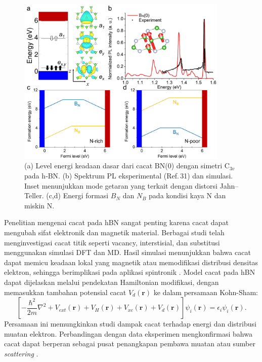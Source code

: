 \begin{figure}[htbp]
  \centering
  \includegraphics[width=0.9\textwidth]{gambar/elektronik_hBN_antisite.jpg}
  \caption{(a) Level energi keadaan dasar dari cacat BN(0) dengan simetri $\mathrm{C}_{3v}$ pada h‑BN. 
    (b) Spektrum PL eksperimental (Ref.\,31) dan simulasi. Inset menunjukkan mode getaran yang terkait dengan distorsi Jahn–Teller. 
    (c,d) Energi formasi $B_N$ dan $N_B$ pada kondisi kaya N dan miskin N. \cite{song2025}}
  \label{fig:BN0_JT_formation_energy}
\end{figure}
Penelitian mengenai cacat pada hBN sangat penting karena cacat dapat mengubah sifat elektronik dan magnetik material.
Berbagai studi telah menginvestigasi cacat titik seperti vacancy, interstisial, dan substitusi menggunakan simulasi DFT dan MD.
Hasil simulasi menunjukkan bahwa cacat dapat memicu keadaan lokal yang magnetik atau memodifikasi distribusi densitas elektron, sehingga berimplikasi pada aplikasi spintronik \cite{Zhang2020}.
Model cacat pada hBN dapat dijelaskan melalui pendekatan Hamiltonian modifikasi, dengan memasukkan tambahan potensial cacat \(V_d(\mathbf{r})\) ke dalam persamaan Kohn-Sham:
\begin{equation}
    \left[-\frac{\hbar^2}{2m}\nabla^2 + V_{ext}(\mathbf{r}) + V_H(\mathbf{r}) + V_{xc}(\mathbf{r}) + V_d(\mathbf{r})\right]\psi_i(\mathbf{r}) = \epsilon_i \psi_i(\mathbf{r}).
\end{equation}
Persamaan ini memungkinkan studi dampak cacat terhadap energi dan distribusi muatan elektron.
Perbandingan dengan data eksperimen mengkonfirmasi bahwa cacat dapat berperan sebagai pusat penangkapan pembawa muatan atau sumber \emph{scattering} \cite{Zhang2020}.

